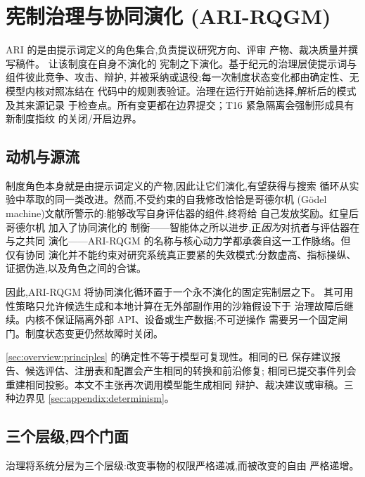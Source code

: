 \section{宪制治理与协同演化 (ARI-RQGM)}\label{sec:rqgm}

ARI 的是由提示词定义的角色集合,负责提议研究方向、评审
产物、裁决质量并撰写稿件。 让该制度在自身不演化的
宪制之下演化。基于纪元的治理层使提示词与组件彼此竞争、攻击、辩护,
并被采纳或退役;每一次制度状态变化都由确定性、无模型内核对照冻结在
代码中的规则表验证。治理在运行开始前选择,解析后的模式及其来源记录
于检查点。所有变更都在边界提交；T16 紧急隔离会强制形成具有新制度指纹
的关闭/开启边界。

\subsection{动机与源流}\label{sec:rqgm:motivation}

制度角色本身就是由提示词定义的产物,因此让它们演化,有望获得与搜索
循环从实验中萃取的同一类改进。然而,不受约束的自我修改恰恰是哥德尔机
(G\"odel machine)文献所警示的:能够改写自身评估器的组件,终将给
自己发放奖励。红皇后哥德尔机 \cite{iacob2026red} 加入了协同演化的
制衡——智能体之所以进步,正\emph{因为}对抗者与评估器在与之共同
演化——ARI-RQGM 的名称与核心动力学都承袭自这一工作脉络。但仅有协同
演化并不能约束对研究系统真正要紧的失效模式:分数虚高、指标操纵、
证据伪造,以及角色之间的合谋。

因此,ARI-RQGM 将协同演化循环置于一个永不演化的固定宪制层之下。
其可用性策略只允许候选生成和本地计算在无外部副作用的沙箱假设下于
治理故障后继续。内核不保证隔离外部 API、设备或生产数据;不可逆操作
需要另一个固定闸门。制度状态变更仍然故障时关闭。

\cref{sec:overview:principles} 的确定性不等于模型可复现性。相同的已
保存建议报告、候选评估、注册表和配置会产生相同的转换和前沿修复;
相同已提交事件列会重建相同投影。本文不主张再次调用模型能生成相同
辩护、裁决建议或审稿。三种边界见 \cref{sec:appendix:determinism}。

\subsection{三个层级,四个门面}\label{sec:rqgm:layers}

治理将系统分层为三个层级:改变事物的权限严格递减,而被改变的自由
严格递增。

